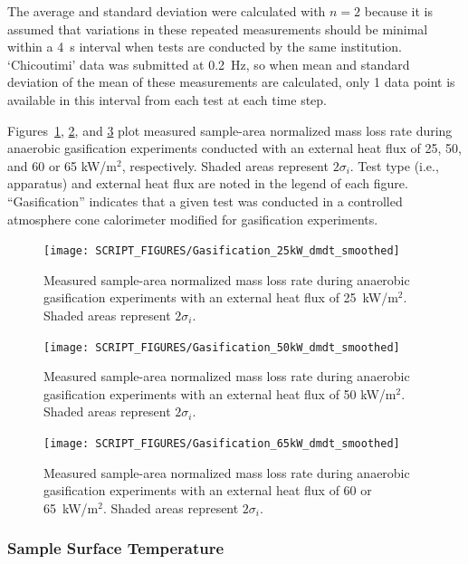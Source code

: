 \documentclass{book}
\begin{document}
The average and standard deviation were calculated with $n=2$ because it is assumed that variations in these repeated measurements should be minimal within a 4~s interval when tests are conducted by the same institution. `Chicoutimi' data was submitted at 0.2~Hz, so when mean and standard deviation of the mean of these measurements are calculated, only 1 data point is available in this interval from each test at each time step.

Figures~\ref{Fig:Gasification_25kW_dmdt}, \ref{Fig:Gasification_50kW_dmdt}, and \ref{Fig:Gasification_65kW_dmdt} plot measured sample-area normalized mass loss rate during anaerobic gasification experiments conducted with an external heat flux of 25, 50, and 60 or 65 kW/m$^2$, respectively. Shaded areas represent $2\sigma_i$. Test type (i.e., apparatus) and external heat flux are noted in the legend of each figure. ``Gasification'' indicates that a given test was conducted in a controlled atmosphere cone calorimeter modified for gasification experiments.

\begin{figure}
  \centering
  \texttt{[image: SCRIPT\_FIGURES/Gasification\_25kW\_dmdt\_smoothed]}
  \caption{Measured sample-area normalized mass loss rate during anaerobic gasification experiments with an external heat flux of 25~kW/m$^2$. Shaded areas represent $2\sigma_i$.}
  \label{Fig:Gasification_25kW_dmdt}
\end{figure}

\begin{figure}
  \centering
  \texttt{[image: SCRIPT\_FIGURES/Gasification\_50kW\_dmdt\_smoothed]}
  \caption{Measured sample-area normalized mass loss rate during anaerobic gasification experiments with an external heat flux of 50 kW/m$^2$. Shaded areas represent $2\sigma_i$.}
  \label{Fig:Gasification_50kW_dmdt}
\end{figure}

\begin{figure}
  \centering
  \texttt{[image: SCRIPT\_FIGURES/Gasification\_65kW\_dmdt\_smoothed]}
  \caption{Measured sample-area normalized mass loss rate during anaerobic gasification experiments with an external heat flux of 60 or 65~kW/m$^2$. Shaded areas represent $2\sigma_i$.}
  \label{Fig:Gasification_65kW_dmdt}
\end{figure}

\newpage
\subsubsection{Sample Surface Temperature}
\end{document}
